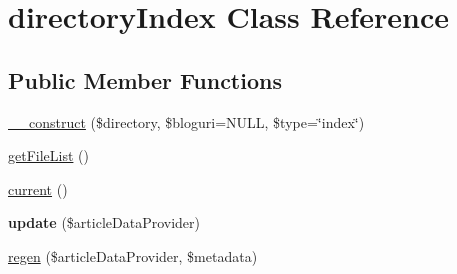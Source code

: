 \hypertarget{classdirectoryIndex}{\section{directory\-Index Class Reference}
\label{classdirectoryIndex}
}
\subsection*{Public Member Functions}
\begin{DoxyCompactItemize}
\item 
\hyperlink{classdirectoryIndex_ac6452a0522c933bce94a29b1e73f5888}{\-\_\-\-\_\-construct} (\$directory, \$bloguri=N\-U\-L\-L, \$type=\char`\"{}index\char`\"{})
\item 
\hyperlink{classdirectoryIndex_ac3cda803c2cf540bd5159c17e787adfd}{get\-File\-List} ()
\item 
\hyperlink{classdirectoryIndex_ae483a88da6be38c60ca7d2461ab14bf8}{current} ()
\item 
\hypertarget{classdirectoryIndex_a957e42a3e152f3234a3629e3a3d6f1f3}{{\bfseries update} (\$article\-Data\-Provider)}\label{classdirectoryIndex_a957e42a3e152f3234a3629e3a3d6f1f3}

\item 
\hyperlink{classdirectoryIndex_a7679eba4893f9efc4cea97027189a736}{regen} (\$article\-Data\-Provider, \$metadata)
\end{DoxyCompactItemize}

